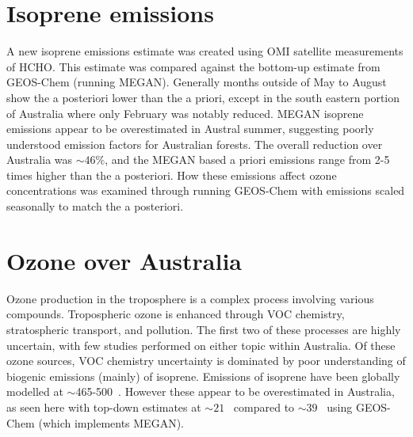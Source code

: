 

\section{Isoprene emissions}
\label{Conclusions:isoprene}

  A new isoprene emissions estimate was created using OMI satellite measurements of HCHO.
  This estimate was compared against the bottom-up estimate from GEOS-Chem (running MEGAN).
  Generally months outside of May to August show the a posteriori lower than the a priori, except in the south eastern portion of Australia where only February was notably reduced.
  MEGAN isoprene emissions appear to be overestimated in Austral summer, suggesting poorly understood emission factors for Australian forests.
  The overall reduction over Australia was $\sim{46}\%$, and the MEGAN based a priori emissions range from 2-5 times higher than the a posteriori.
  How these emissions affect ozone concentrations was examined through running GEOS-Chem with emissions scaled seasonally to match the a posteriori.
  
\section{Ozone over Australia}
\label{Conclusions:ozone}
  
  Ozone production in the troposphere is a complex process involving various compounds.
  Tropospheric ozone is enhanced through VOC chemistry, stratospheric transport, and pollution.
  The first two of these processes are highly uncertain, with few studies performed on either topic within Australia.
  Of these ozone sources, VOC chemistry uncertainty is dominated by poor understanding of biogenic emissions (mainly) of isoprene.
  Emissions of isoprene have been globally modelled at $\sim$465-500\tgcpyr ~\parencite{Guenther2006, Messina2016}. 
  However these appear to be overestimated in Australia, as seen here with top-down estimates at $\sim 21$ \tgcpyr ~compared to $\sim 39$ \tgcpyr ~using GEOS-Chem (which implements MEGAN).
  
